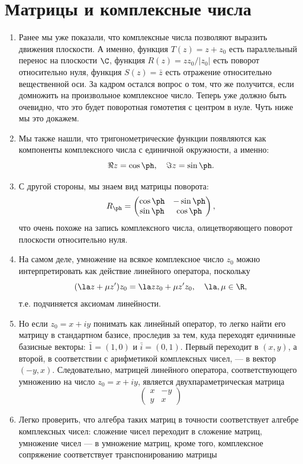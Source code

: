 \section{Матрицы и комплексные числа}




\begin{enumerate}
\item Ранее мы уже показали, что комплексные числа позволяют выразить движения плоскости. А именно, функция $T(z)=z+z_0$ есть параллельный перенос на плоскости $\C$, функция $R(z) = zz_0/|z_0|$ есть поворот относительно нуля, функция $S(z)=\bar z$ есть отражение относительно вещественной оси. За кадром остался вопрос о том, что же получится, если домножить на произвольное комплексное число. Теперь уже должно быть очевидно, что это будет поворотная гомотетия с центром в нуле. Чуть ниже мы это докажем.
\item Мы также нашли, что тригонометрические функции появляются как компоненты комплексного числа с единичной окружности, а именно:
$$
\Re z = \cos\ph,\quad \Im z=\sin\ph.
$$
\item С другой стороны, мы знаем вид матрицы поворота:
$$
R_\ph = \begin{pmatrix}
\cos\ph & -\sin\ph \\ \sin\ph & \cos\ph
\end{pmatrix},
$$
что очень похоже на запись комплексного числа, олицетворяющего поворот плоскости относительно нуля.
\item На самом деле, умножение на всякое комплексное число $z_0$ можно интерпретировать как действие линейного оператора, поскольку
$$
(\la z+\mu z')z_0 = \la zz_0 + \mu z'z_0,\quad \la,\mu\in\R,
$$
т.е. подчиняется аксиомам линейности.
\item Но если $z_0=x+iy$ понимать как линейный оператор, то легко найти его матрицу в стандартном базисе, проследив за тем, куда переходят едичниные базисные векторы: $\bar 1=(1,0)$ и $\bar i=(0,1)$. Первый переходит в $(x,y)$, а второй, в соответствии с арифметикой комплексных чисел, --- в вектор $(-y,x)$. Следовательно, матрицей линейного оператора, соответствующего умножению на число $z_0=x+iy$, является двухпараметрическая матрица
$$
\begin{pmatrix}
x & -y \\ y & x
\end{pmatrix}
$$
\item Легко проверить, что алгебра таких матриц в точности соответствует алгебре комплексных чисел: сложение чисел переходит в сложение матриц, умножение чисел --- в умножение матриц, кроме того, комплексное сопряжение соответствует транспонированию матрицы

\end{enumerate}
